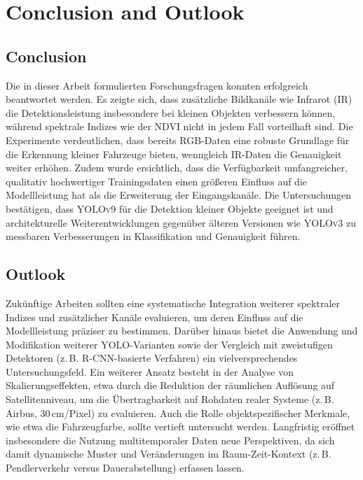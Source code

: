 \chapter{Conclusion and Outlook}
\label{ch:conclusion}

\section{Conclusion}
Die in dieser Arbeit formulierten Forschungsfragen konnten erfolgreich beantwortet werden. 
Es zeigte sich, dass zusätzliche Bildkanäle wie Infrarot (IR) die Detektionsleistung insbesondere bei kleinen Objekten verbessern können, während spektrale Indizes wie der NDVI nicht in jedem Fall vorteilhaft sind. 
Die Experimente verdeutlichen, dass bereits RGB-Daten eine robuste Grundlage für die Erkennung kleiner Fahrzeuge bieten, wenngleich IR-Daten die Genauigkeit weiter erhöhen. 
Zudem wurde ersichtlich, dass die Verfügbarkeit umfangreicher, qualitativ hochwertiger Trainingsdaten einen größeren Einfluss auf die Modellleistung hat als die Erweiterung der Eingangskanäle. 
Die Untersuchungen bestätigen, dass \textsc{YOLOv9} für die Detektion kleiner Objekte geeignet ist und architekturelle Weiterentwicklungen gegenüber älteren Versionen wie \textsc{YOLOv3} zu messbaren Verbesserungen in Klassifikation und Genauigkeit führen.

\section{Outlook}
Zukünftige Arbeiten sollten eine systematische Integration weiterer spektraler Indizes und zusätzlicher Kanäle evaluieren, um deren Einfluss auf die Modellleistung präziser zu bestimmen. 
Darüber hinaus bietet die Anwendung und Modifikation weiterer \textsc{YOLO}-Varianten sowie der Vergleich mit zweistufigen Detektoren (z.\,B. \textsc{R-CNN}-basierte Verfahren) ein vielversprechendes Untersuchungsfeld. 
Ein weiterer Ansatz besteht in der Analyse von Skalierungseffekten, etwa durch die Reduktion der räumlichen Auflösung auf Satellitenniveau, um die Übertragbarkeit auf Rohdaten realer Systeme (z.\,B. Airbus, 30\,cm/Pixel) zu evaluieren. 
Auch die Rolle objektspezifischer Merkmale, wie etwa die Fahrzeugfarbe, sollte vertieft untersucht werden. 
Langfristig eröffnet insbesondere die Nutzung multitemporaler Daten neue Perspektiven, da sich damit dynamische Muster und Veränderungen im Raum-Zeit-Kontext (z.\,B. Pendlerverkehr versus Dauerabstellung) erfassen lassen.

